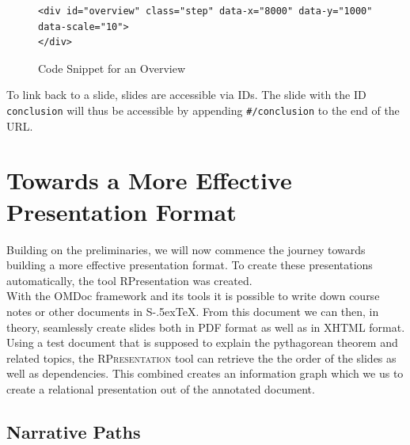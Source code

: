 \documentclass[twoside, 12pt]{article}
\def\stex{\texorpdfstring{\raisebox{-.5ex}S\kern-.5ex\TeX}{sTeX}\xspace}
\newcommand{\sys}{\textsc{RPresentation}\xspace}
\begin{document}
\begin{figure}
\vspace{-26pt}
\begin{verbatim}
<div id="overview" class="step" data-x="8000" data-y="1000" data-scale="10">
</div>
\end{verbatim}
\vspace{-7pt}
  \caption{Code Snippet for an Overview}
  \label{fig:SSlide}
  \vspace{12pt}
\end{figure}

\begin{figure}
\vspace{-50pt}
\end{figure}

To link back to a slide, slides are accessible via IDs. The slide with the ID \texttt{conclusion} will thus be accessible by appending \texttt{\#/conclusion} to the end of the URL.

\section{Towards a More Effective Presentation Format}
\label{sec:TowardsAMoreEffectivePresentationFormat}

Building on the preliminaries, we will now commence the journey towards building a more effective presentation format. To create these presentations automatically, the tool RPresentation \cite{npentrel:npentrel15} was created.\\

With the OMDoc framework and its tools it is possible to write down course notes or other documents in \stex. From this document we can then, in theory, seamlessly create slides both in PDF format as well as in XHTML format. Using a test document that is supposed to explain the pythagorean theorem and related topics, the \sys tool can retrieve the the order of the slides as well as dependencies. This combined creates an information graph which we us to create a relational presentation out of the annotated document.\\


\subsection{Narrative Paths}
\label{sec:narrativePaths}
\end{document}
